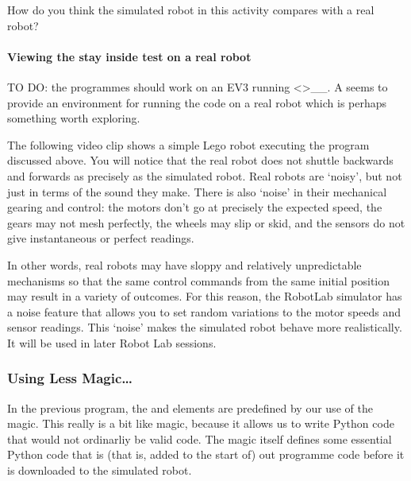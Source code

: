 \documentclass[letterpaper,10pt,english]{sphinxmanual}
\begin{document}
How do you think the simulated robot in this activity compares with a real robot?


\paragraph{Viewing the stay inside test on a real robot}
\label{\detokenize{content/00_SOFTWARE_GUIDE/Section_00_03_quick_practical_tour:Viewing-the-stay-inside-test-on-a-real-robot}}


TO DO: the programmes should work on an EV3 running  \textless{}\textgreater{}\textasciigrave{}\_\_. A  seems to provide an environment for running the  code on a real robot which is perhaps something worth exploring. 



The following video clip shows a simple Lego robot executing the  program discussed above. You will notice that the real robot does not shuttle backwards and forwards as precisely as the simulated robot. Real robots are ‘noisy’, but not just in terms of the sound they make. There is also ‘noise’ in their mechanical gearing and control: the motors don’t go at precisely the expected speed, the gears may not mesh perfectly, the wheels may slip or skid, and the sensors do not give
instantaneous or perfect readings.

In other words, real robots may have sloppy and relatively unpredictable mechanisms so that the same control commands from the same initial position may result in a variety of outcomes. For this reason, the RobotLab simulator has a noise feature that allows you to set random variations to the motor speeds and sensor readings. This ‘noise’ makes the simulated robot behave more realistically. It will be used in later Robot Lab sessions.


\subsubsection{Using Less Magic…}
\label{\detokenize{content/00_SOFTWARE_GUIDE/Section_00_03_quick_practical_tour:Using-Less-Magic_u2026}}
In the previous program, the  and  elements are predefined by our use of the  magic. This really is a bit like magic, because it allows us to write Python code that would not ordinarliy be valid code. The magic itself defines some essential Python code that is  (that is, added to the start of) out programme code before it is downloaded to the simulated robot.
\end{document}
